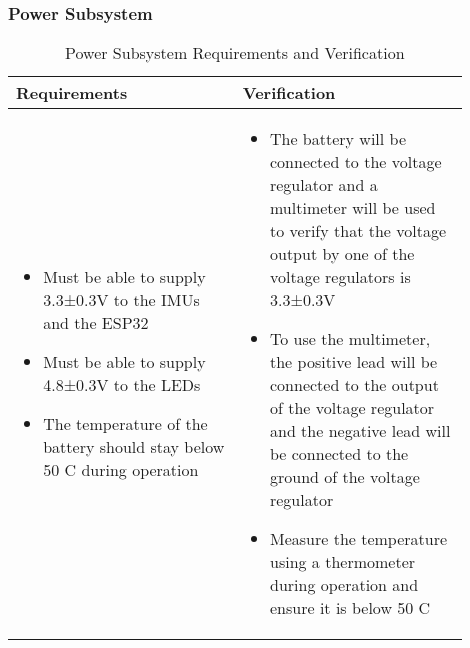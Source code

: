 \subsubsection{Power Subsystem}
\begin{table}[h]
    \centering
    \caption{Power Subsystem Requirements and Verification}
    \begin{tabular}{p{0.45\linewidth}p{0.45\linewidth}}
    \toprule
    \textbf{Requirements} & \textbf{Verification} \\
    \midrule
    \begin{itemize}[leftmargin=*, nosep, after=\strut]
        \item Must be able to supply 3.3±0.3V to the IMUs and the ESP32
        \item Must be able to supply 4.8±0.3V to the LEDs
        \item The temperature of the battery should stay below 50 C during operation
        
    \end{itemize} &
    \begin{itemize}[leftmargin=*, nosep, after=\strut]
        \item The battery will be connected to the voltage regulator and a multimeter will be used to verify that the voltage output by one of the voltage regulators is 3.3±0.3V
        \item To use the multimeter, the positive lead will be connected to the output of the voltage regulator and the negative lead will be connected to the ground of the voltage regulator
        \item Measure the temperature using a thermometer during operation and ensure it is below 50 C
    \end{itemize} \\
    \bottomrule
    \end{tabular}
    \end{table}
    \newpage

